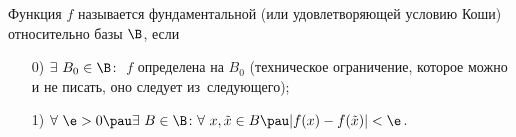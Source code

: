
 	Функция $f$ называется фундаментальной (или удовлетворяющей условию Коши) относительно базы $\B$, если
 	\begin{itemize}
 	  \item [0)] $\exists\  B_0\in\B\colon$ $f$ определена на $B_0$ (техническое ограничение, которое можно и не писать, оно следует из~следующего);
 	  \item [1)] $\forall\ \e>0\pau \exists\  B\in\B\colon\forall\  x,\tilde x\in B\pau |f(x)-f(\tilde x)|<\e$.
 	\end{itemize}
 